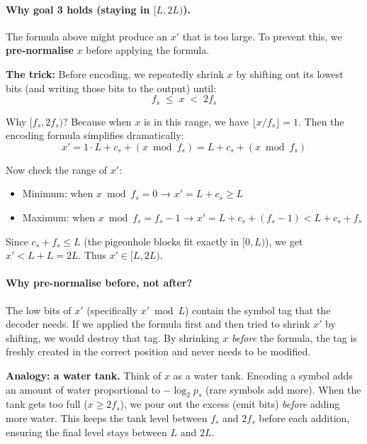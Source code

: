 \paragraph{Why goal 3 holds (staying in $[L, 2L)$).}
The formula above might produce an $x'$ that is too large.
To prevent this, we \textbf{pre-normalise} $x$ before applying
the formula.

\textbf{The trick:} Before encoding, we repeatedly shrink $x$
by shifting out its lowest bits (and writing those bits to the
output) until:
\[
f_s \;\le\; x \;<\; 2f_s
\]

Why $[f_s, 2f_s)$?  Because when $x$ is in this range, we have
$\lfloor x/f_s \rfloor = 1$.  Then the encoding formula
simplifies dramatically:
\[
x' = 1 \cdot L + c_s + (x \bmod f_s) = L + c_s + (x \bmod f_s)
\]

Now check the range of $x'$:
\begin{itemize}
  \item Minimum: when $x \bmod f_s = 0$ → $x' = L + c_s \ge L$
  \item Maximum: when $x \bmod f_s = f_s-1$ → $x' = L + c_s + (f_s-1) < L + c_s + f_s$
\end{itemize}

Since $c_s + f_s \le L$ (the pigeonhole blocks fit exactly in
$[0, L)$), we get $x' < L + L = 2L$.  Thus $x' \in [L, 2L)$.

\paragraph{Why pre-normalise before, not after?}
The low bits of $x'$ (specifically $x' \bmod L$) contain the
symbol tag that the decoder needs.  If we applied the formula
first and then tried to shrink $x'$ by shifting, we would
destroy that tag.  By shrinking $x$ \emph{before} the formula,
the tag is freshly created in the correct position and never
needs to be modified.

\begin{importantbox}
\textbf{Analogy: a water tank.}
Think of $x$ as a water tank.  Encoding a symbol adds an
amount of water proportional to $-\log_2 p_s$ (rare symbols
add more).  When the tank gets too full ($x \ge 2f_s$), we
pour out the excess (emit bits) \emph{before} adding more
water.  This keeps the tank level between $f_s$ and $2f_s$
before each addition, ensuring the final level stays between
$L$ and $2L$.
\end{importantbox}

